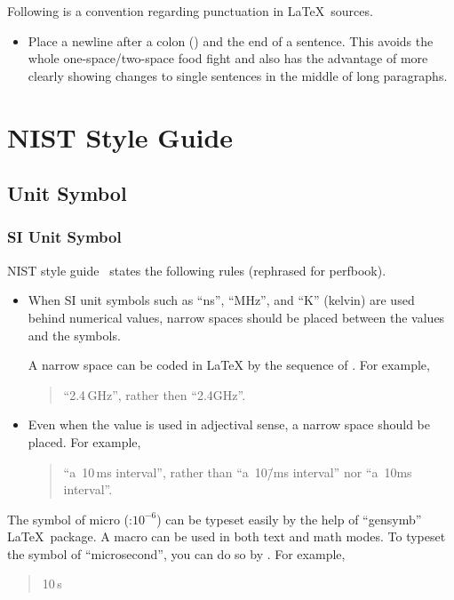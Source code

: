 Following is a convention regarding punctuation in \LaTeX\ sources.

\begin{itemize}
\item Place a newline after a colon (\co{:}) and the end of a sentence.
  This avoids the whole one-space/two-space food fight and also has
  the advantage of more clearly showing changes to single sentences
  in the middle of long paragraphs.
\end{itemize}

\section{NIST Style Guide}
\label{sec:app:styleguide:NIST Style Guide}

\subsection{Unit Symbol}
\label{sec:app:styleguide:Unit Symbol}

\subsubsection{SI Unit Symbol}
\label{sec:app:styleguide:SI Unit Symbol}

NIST style guide~\cite[Chapter 5]{NIST:SP:330:2019}
states the following rules (rephrased for perfbook).

\begin{itemize}
\item When SI unit symbols such as ``ns'', ``MHz'', and ``K'' (kelvin)
are used behind numerical values, narrow spaces should be placed between
the values and the symbols.

A narrow space can be coded in \LaTeX{} by the sequence of \qco{\\,}.
For example,
\begin{quote}
  ``2.4\,GHz'', rather then ``2.4GHz''.
\end{quote}

\item Even when the value is used in adjectival sense, a narrow space
  should be placed.
  For example,
\begin{quote}
  ``a~10\,ms interval'', rather than ``a~10\=/ms interval'' nor
  ``a~10ms interval''.
\end{quote}
\end{itemize}

The symbol of micro (\micro :$10^{-6}$) can be typeset easily by
the help of ``gensymb'' \LaTeX\ package.
A macro \qco{\\micro} can be used in both text and math modes.
To typeset the symbol of ``microsecond'', you can do
so by .
For example,
\begin{quote}
  10\,\micro s
\end{quote}


